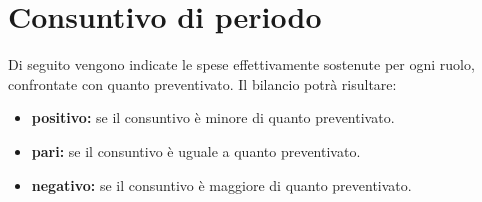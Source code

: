 \section{Consuntivo di periodo}

Di seguito vengono indicate le spese effettivamente sostenute per ogni ruolo, confrontate con quanto preventivato. Il bilancio potrà risultare:

\begin{itemize}
\item \textbf{positivo:} se il consuntivo è minore di quanto preventivato.
\item \textbf{pari:} se il consuntivo è uguale a quanto preventivato.
\item \textbf{negativo:} se il consuntivo è maggiore di quanto preventivato.
\end{itemize}


